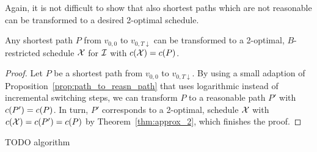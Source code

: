 Again, it is not difficult to show that also shortest paths which are not reasonable can be transformed to a desired 2-optimal schedule.
\begin{cor}\label{cor:opt_sched_short_path_pseudo_lin}
Any shortest path $P$ from $v_{0,0}$ to $v_{0,T\downarrow}$ can be transformed to a 2-optimal, $B$-restricted schedule $\mathcal{X}$ for $\mathcal{I}$ with $c(\mathcal{X})=c(P)$.
\end{cor}
\begin{proof}
Let $P$ be a shortest path from $v_{0,0}$ to $v_{0,T\downarrow}$. By using a small adaption of Proposition~\ref{prop:path_to_reasn_path} that uses logarithmic instead of incremental switching steps, we can transform $P$ to a reasonable path $P'$ with $c(P')=c(P)$.
In turn, $P'$ corresponds to a 2-optimal,  schedule $\mathcal{X}$ with $c(\mathcal{X})=c(P')=c(P)$ by Theorem~\ref{thm:approx_2}, which finishes the proof.
\end{proof}
TODO algorithm


